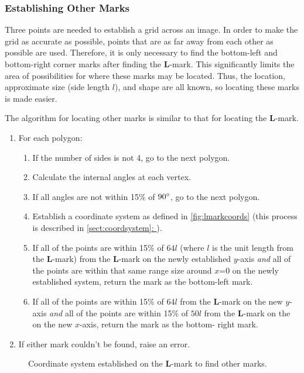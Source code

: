 \documentclass[12pt, letterpaper]{report}
\newcommand*{\sectref}[1]{\hypersetup{linkcolor=usfgreen}\hyperref[{#1}]{\ref*{#1}: \nameref*{#1}}}
\newcommand*{\itemref}[1]{\hypersetup{linkcolor=usfgreen}\hyperref[{#1}]{\autoref*{#1}}}
\newcommand*{\boxedimage}[1]{\fbox{\texttt{[image: img/\#1]}}}
\newcommand{\fig}[3]{
  \begin{figure}[h]
    \caption{#1}
    \label{#3}
    \centering
    \boxedimage{#2}
  \end{figure}
}
\begin{document}
\subsubsection{Establishing Other Marks}
Three points are needed to establish a grid across an image.
In order to make the grid as accurate as possible, points that
are as far away from each other as possible are used. Therefore, it is only
necessary to find the bottom-left and bottom-right corner marks after finding
the \textbf{L}-mark. This significantly limits the area of possibilities for where these marks
may be located. Thus, the location, approximate size (side length $l$), and shape
are all known, so locating these marks is made easier.

The algorithm for locating other marks is similar to that for locating the
\textbf{L}-mark.

\begin{enumerate}
  \item For each polygon:
    \begin{enumerate}
      \item If the number of sides is not 4, go to the next polygon.
      \item Calculate the internal angles at each vertex.
      \item If all angles are not within 15\% of $90\degree$, go to the next polygon.
      \item Establish a coordinate system as defined in \itemref{fig:lmarkcoords} (this process is described in \sectref{sect:coordsystem}).
      \item If all of the points are within 15\% of $64l$ (where $l$ is the unit
      length from the \textbf{L}-mark) from the \textbf{L}-mark on the newly established
      $y$-axis \textit{and} all of the points are within that same range size
      around $x$=0 on the newly established system, return the mark as the
      bottom-left mark.
      \item If all of the points are within 15\% of $64l$ from the \textbf{L}-mark on the
      new $y$-axis \textit{and} all of the points are within 15\% of $50l$ from
      the \textbf{L}-mark on the on the new $x$-axis, return the mark as the bottom-
      right mark.
    \end{enumerate}
  \item If either mark couldn't be found, raise an error.
\end{enumerate}

\fig{Coordinate system established on the \textbf{L}-mark to find other marks.}{coords.png}{fig:lmarkcoords}
\end{document}
